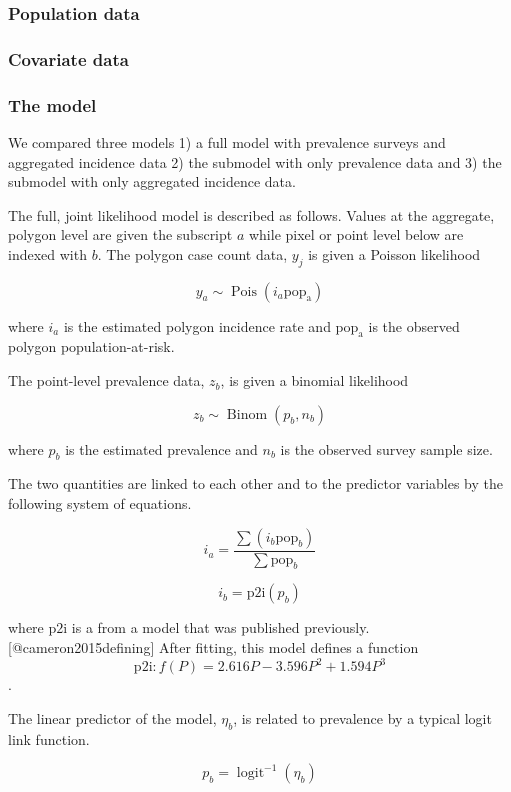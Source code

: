 \subsubsection{Population data}\label{population-data}

\subsubsection{Covariate data}\label{covariate-data}

\subsubsection{The model}\label{the-model}

We compared three models 1) a full model with prevalence surveys and
aggregated incidence data 2) the submodel with only prevalence data and
3) the submodel with only aggregated incidence data.

The full, joint likelihood model is described as follows. Values at the
aggregate, polygon level are given the subscript \(a\) while pixel or
point level below are indexed with \(b\). The polygon case count data,
\(y_j\) is given a Poisson likelihood

\[y_a \sim \operatorname{Pois}(i_a\mathrm{pop_a})\]

where \(i_a\) is the estimated polygon incidence rate and
\(\mathrm{pop_a}\) is the observed polygon population-at-risk.

The point-level prevalence data, \(z_b\), is given a binomial likelihood

\[z_b \sim \operatorname{Binom}(p_b, n_b) \]

where \(p_b\) is the estimated prevalence and \(n_b\) is the observed
survey sample size.

The two quantities are linked to each other and to the predictor
variables by the following system of equations.

\[i_a = \frac{ \sum(i_b \mathrm{pop}_b)}{\sum  \mathrm{pop}_b} \]

\[i_b = \mathrm{p2i}(p_b)\]

where \(\mathrm{p2i}\) is a from a model that was published previously.
{[}@cameron2015defining{]} After fitting, this model defines a function
\[\mathrm{p2i}: f\left(P\right) = 2.616P - 3.596P^2 + 1.594P^3\].

The linear predictor of the model, \(\eta_b\), is related to prevalence
by a typical logit link function.

\[p_b = \operatorname{logit}^{-1}(\eta_b)\]

